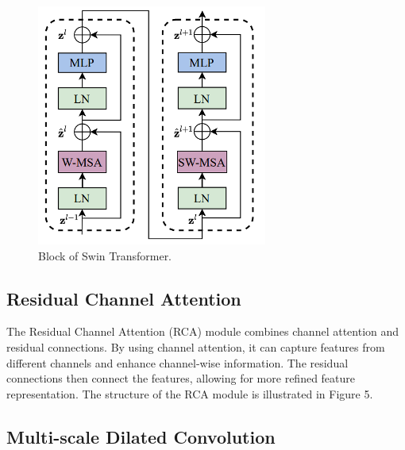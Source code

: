 \documentclass[10pt,twocolumn,letterpaper]{article}
\begin{document}
\begin{figure}
  \includegraphics[width=0.5\linewidth]{Images/ST_2.png}
  \caption{Block of Swin Transformer.}
  \label{fig:st_2}
\end{figure}



\subsection{Residual Channel Attention}

The Residual Channel Attention (RCA) module combines channel attention and residual connections. By using channel attention, it can capture features from different channels and enhance channel-wise information. The residual connections then connect the features, allowing for more refined feature representation. The structure of the RCA module is illustrated in Figure 5.



\subsection{Multi-scale Dilated Convolution}
\end{document}
